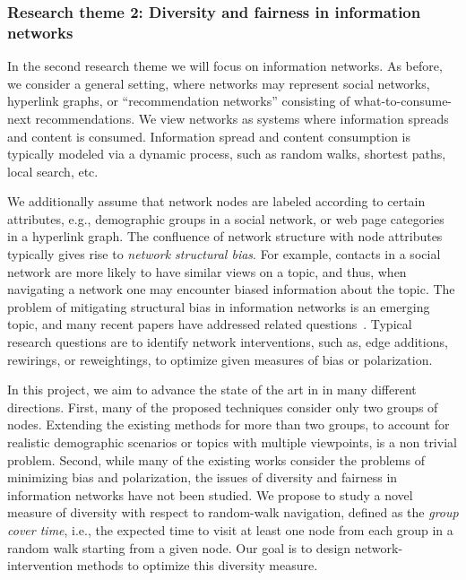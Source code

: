\documentclass[a4paper,11pt]{article}
\begin{document}
\vspace{-1mm}
\subsubsection*{Research theme 2: Diversity and fairness in information networks}
\vspace{-1mm}

In the second research theme we will focus on information networks. 
As before, we consider a general setting, 
where networks may represent
social networks, 
hyperlink graphs, or 
``recommendation networks'' consisting of what-to-consume-next recommendations.
We view networks as systems where information spreads and content is consumed. 
Information spread and content consumption
is typically modeled via a dynamic process, such as random walks, 
shortest paths, local search, etc.

We additionally assume that network nodes are labeled according to certain attributes, 
e.g., demographic groups in a social network, or 
web page categories in a hyperlink graph. 
The confluence of network structure with node attributes typically gives rise to 
\emph{network structural bias}.
For example, contacts in a social network are more likely to have similar views on a topic, 
and thus, when navigating a network one may encounter biased information about the topic.
The problem of mitigating structural bias in information networks is an emerging topic, 
and many recent papers have addressed related questions~\cite{adriaens2022diameter,adriaens2023minimizing,cinus2023rebalancing,coupette2023reducing,fabbri2022rewiring,haddadan2022reducing}.
Typical research questions are to identify network interventions, 
such as, edge additions, re\-wirings, or re\-weightings, 
to optimize given measures of bias or polarization.

In this project, we aim to advance the state of the art in in many different directions. 
First, many of the proposed techniques consider only two groups of nodes.
Extending the existing methods for more than two groups, 
to account for realistic demographic scenarios or topics with multiple viewpoints, 
is a non trivial problem.
Second, while many of the existing works consider the problems of minimizing bias and polarization, 
the issues of diversity and fairness in information networks have not been studied.  
We propose to study a novel measure of diversity with respect to random-walk navigation, 
defined as the \emph{group cover time}, i.e., 
the expected time to visit at least one node from each group
in a random walk starting from a given node.
Our goal is to design network-intervention methods to 
optimize this diversity measure.
\end{document}
